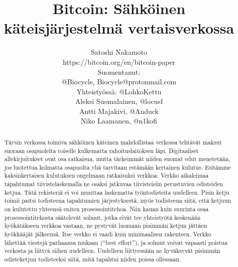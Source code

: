 \documentclass{article}
\begin{document}
\title{Bitcoin: Sähköinen käteisjärjestelmä vertaisverkossa}
\author[1]{\small{Satoshi Nakamoto \\\vspace{-3mm} https://bitcoin.org/en/bitcoin-paper} \\
\vspace{0mm}
\footnotesize{Suomentanut: \\ @Biocycle, Biocycle@protonmail.com \\
Yhteistyössä: @LohkoKettu \\ Aleksi Suomalainen, @locusf \\ Antti Majakivi, @Anduck \\ Niko Laamanen, @n1kofi}}
\date{}
\maketitle

\begin{abstract}
Täysin verkossa toimiva sähköinen käteinen mahdollistaa verkossa tehtävät maksut suoraan osapuolelta toiselle kulkematta rahoituslaitoksen läpi. Digitaaliset allekirjoitukset ovat osa ratkaisua, mutta tär\-keim\-mät niiden suomat edut menetetään, jos luotettua kolmatta osapuolta yhä tarvitaan estämään kertainen kulutus. Esitämme kaksinkertaisen kulutuksen ongelmaan ratkaisuksi verkkoa. Verkko aikaleimaa tapahtumat tiivistelaskemalla ne osaksi jatkuvaa tiivisteisiin perustuvien odisteiden ketjua. Tätä rekisteriä ei voi muuttaa laskematta työntodisteita uudelleen. Pisin ketju toimii paitsi todisteena tapahtumien järjestyksestä, myös todisteena siitä, että ketjuun on kulutettu yhteensä eniten prosessointitehoa. Niin kauan kuin suurinta osaa prosessointitehosta säätelevät solmut, jotka eivät tee yhteistyötä keskenään hyökätäkseen verkkoa vastaan, ne pystyvät luomaan pisimmän ketjun jättäen hyökkääjät jälkeensä. Itse verkko ei vaadi kuin minimaalisen rakenteen. Verkko lähettää viestejä parhaansa mukaan (“best effort”), ja solmut voivat vapaasti poistua verkosta ja liittyä siihen uudelleen. Uudelleen liittyessään ne hyväksyvät pisimmän odisteketjun todisteeksi siitä, mitä tapahtui niiden poissa ollessaan.

\end{abstract}
\end{document}
